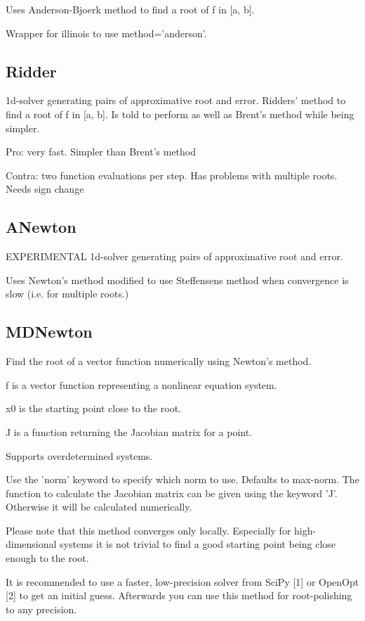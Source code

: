 Uses Anderson-Bjoerk method to find a root of f in [a, b]. 

Wrapper for illinois to use method='anderson'.



\subsection{Ridder}
1d-solver generating pairs of approximative root and error.
Ridders' method to find a root of f in [a, b]. Is told to perform as well as Brent's method while being simpler.

\vpara
Pro: very fast. Simpler than Brent's method

Contra: two function evaluations per step. Has problems with multiple roots. Needs sign change




\subsection{ANewton}
EXPERIMENTAL 1d-solver generating pairs of approximative root and error.

Uses Newton's method modified to use Steffensens method when convergence is slow (i.e. for multiple roots.)



\subsection{MDNewton}
Find the root of a vector function numerically using Newton's method.

f is a vector function representing a nonlinear equation system.

x0 is the starting point close to the root.

J is a function returning the Jacobian matrix for a point.

Supports overdetermined systems.

\vpara
Use the 'norm' keyword to specify which norm to use. Defaults to max-norm. The function to calculate the Jacobian matrix can be given using the keyword 'J'. Otherwise it will be calculated numerically.

\vpara
Please note that this method converges only locally. Especially for high- dimensional systems it is not trivial to find a good starting point being close enough to the root.

\vpara
It is recommended to use a faster, low-precision solver from SciPy [1] or OpenOpt [2] to get an initial guess. Afterwards you can use this method for root-polishing to any precision.




